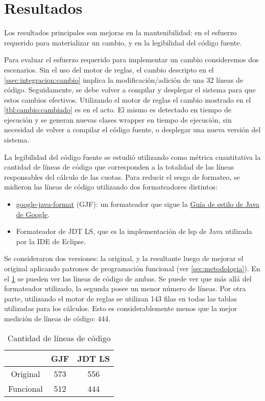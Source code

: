 \section{Resultados}
\label{sec:resultados}

Los resultados principales son mejoras en la mantenibilidad: en el esfuerzo requerido para materializar un cambio, y en la legibilidad del código fuente.

Para evaluar el esfuerzo requerido para implementar un cambio consideremos dos escenarios.
Sin el uso del motor de reglas, el cambio descripto en el \cref{ssec:integracion:cambio} implica la modificación/adición de una 32 líneas de código.
Seguidamente, se debe volver a compilar y desplegar el sistema para que estos cambios efectivos.
%
Utilizando el motor de reglas el cambio mostrado en el \cref{tbl:cambio:cambiado} es en el acto.
El mismo es detectado en tiempo de ejecución y se generan nuevas clases wrapper en tiempo de ejecución, sin necesidad de volver a compilar el código fuente, o desplegar una nueva versión del sistema.


La legibilidad del código fuente se estudió utilizando como métrica cuantitativa la cantidad de líneas de código que corresponden a la totalidad de las líneas responsables del cálculo de las cuotas.
%
Para reducir el sesgo de formateo, se midieron las líneas de código utilizando dos formateadores distintos:
\begin{itemize}
    \item \href{https://github.com/google/google-java-format}{google-java-format} (GJF): un formateador que sigue la \href{https://google.github.io/styleguide/javaguide.html}{Guía de estilo de Java de Google}.
    \item Formateador de JDT LS, que es la implementación de \acrshort{lsp} de Java utilizada por la IDE de Eclipse.
\end{itemize}
Se consideraron dos versiones: la original, y la resultante luego de mejorar el original aplicando patrones de programación funcional (ver \cref{sec:metodologia}).
En el \cref{tbl:results} se pueden ver las líneas de código de ambas.
Se puede ver que más allá del formateador utilizado, la segunda posee un menor número de líneas.
%
Por otra parte, utilizando el motor de reglas se utilizan 143 filas en todas las tablas utilizadas para los cálculos. Esto es considerablemente menos que la mejor medición de líneas de código: 444.
%
\begin{table}[h]
    \centering
    \begin{tabular}{|c|c|c|}
        \hline
                  & GJF & JDT LS \\ \hline
        Original  & 573 & 556    \\ \hline
        Funcional & 512 & 444    \\ \hline
    \end{tabular}
    \caption{Cantidad de líneas de código}
    \label{tbl:results}
\end{table}

